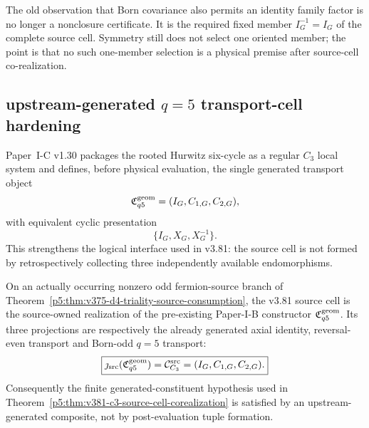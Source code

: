 \documentclass[12pt,a4paper]{article}
\begin{document}
\begin{remark}
\label{p5:rem:v381-identity-fixed-branch}
The old observation that Born covariance also permits an identity family
factor is no longer a nonclosure certificate.  It is the required fixed member
\(I_G^{-1}=I_G\) of the complete source cell.  Symmetry still does not select
one oriented member; the point is that no such one-member selection is a
physical premise after source-cell co-realization.
\end{remark}




\subsection{upstream-generated \texorpdfstring{$q=5$}{q=5} transport-cell hardening}
\label{p5:sec:v382-upstream-generated-q5-cell}

Paper~I-C v1.30 packages the rooted Hurwitz six-cycle as a regular $C_3$
local system and defines, before physical evaluation, the single generated
transport object
\[
 \mathfrak C_{q5}^{\rm geom}
 =(I_G,C_{1,G},C_{2,G}),
\]
with equivalent cyclic presentation
\[
 \{I_G,X_G,X_G^{-1}\}.
\]
This strengthens the logical interface used in v3.81: the source cell is not
formed by retrospectively collecting three independently available
endomorphisms.

\begin{theorem}
\label{p5:thm:v382-upstream-generated-source-cell}
On an actually occurring nonzero odd fermion-source branch of
Theorem~\ref{p5:thm:v375-d4-triality-source-consumption}, the v3.81 source cell
is the source-owned realization of the pre-existing Paper-I-B constructor
$\mathfrak C_{q5}^{\rm geom}$.  Its three projections are respectively the
already generated axial identity, reversal-even transport and Born-odd
$q=5$ transport:
\[
 \boxed{
 \jmath_{\rm src}(\mathfrak C_{q5}^{\rm geom})
 =\mathcal C_{C_3}^{\rm src}
 =(I_G,C_{1,G},C_{2,G}).}
\]
Consequently the finite generated-constituent hypothesis used in
Theorem~\ref{p5:thm:v381-c3-source-cell-corealization} is satisfied by an
upstream-generated composite, not by post-evaluation tuple formation.
\end{theorem}
\end{document}
